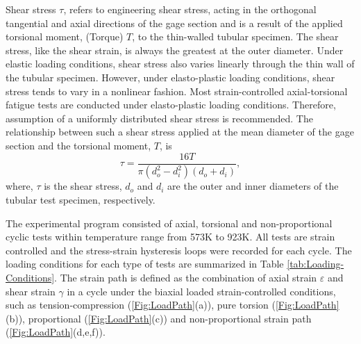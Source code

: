 Shear stress $\tau$, refers to engineering shear stress, acting in the orthogonal tangential and axial directions of the gage section and is a result of the applied torsional moment, (Torque) $T$, to the thin-walled tubular specimen. The shear stress, like the shear strain, is always the greatest at the outer diameter. Under elastic loading conditions, shear stress also varies linearly through the thin wall of the tubular specimen. However, under elasto-plastic loading conditions, shear stress tends to vary in a nonlinear fashion. Most strain-controlled axial-torsional fatigue tests are conducted under elasto-plastic loading conditions. Therefore, assumption of a uniformly distributed shear stress is recommended. The relationship between such a shear stress applied at the mean diameter of the gage section and the torsional moment, $T$, is
\begin{equation}
\tau=\frac{16T}{\pi(d_o^2-d_i^2)(d_o+d_i)},
\end{equation}
where, $\tau$ is the shear stress, $d_o$ and $d_i$ are the outer and inner diameters of the tubular test specimen, respectively.

The experimental program consisted of axial, torsional and non-proportional cyclic tests within temperature range from 573K to 923K.
All tests are strain controlled and the stress-strain hysteresis loops were recorded for each cycle.
The loading conditions for each type of tests are summarized in Table \ref{tab:Loading-Conditions}.
The strain path is defined as the combination of axial strain $\varepsilon$ and shear strain $\gamma$ in a cycle under the biaxial loaded strain-controlled conditions, such as tension-compression (\ref{Fig:LoadPath}(a)), pure torsion (\ref{Fig:LoadPath}(b)), proportional (\ref{Fig:LoadPath}(c)) and non-proportional strain path (\ref{Fig:LoadPath}(d,e,f)).

